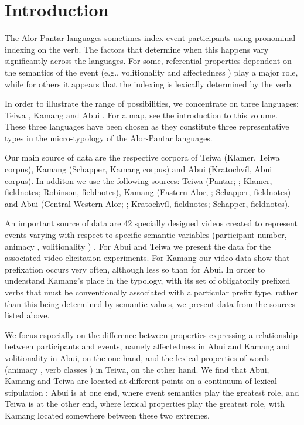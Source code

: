 
  
\section{Introduction}
\label{sec:10:1}
\hypertarget{Toc385255248}{}The Alor-Pantar languages sometimes index event participants using pronominal indexing  on the verb. The factors that determine when this happens vary significantly across the languages. For some, referential properties  dependent on the semantics of the event (e.g., volitionality  and affectedness ) play a major role, while for others it appears that the indexing is lexically determined by the verb.

In order to illustrate the range of possibilities, we concentrate on three languages: Teiwa , Kamang  and Abui . For a map, see the introduction to this volume. These three languages have been chosen as they constitute three representative types in the micro-typology of the Alor-Pantar languages. 

Our main source of data are the respective corpora of Teiwa  (Klamer, Teiwa corpus), Kamang  (Schapper, Kamang corpus) and Abui  (Kratochv\'il, Abui corpus). In additon we use the following sources: Teiwa (Pantar; \citet{Klamer2010grammar}; Klamer, fieldnotes; Robinson, fieldnotes), Kamang (Eastern Alor, \citet{SchapperEtAl2011}; Schapper, fieldnotes) and Abui (Central-Western Alor; \citet{Kratochvil2007,Kratochvil2011transitivity}; Kratochv\'il, fieldnotes; Schapper, fieldnotes).

An important source of data are 42 specially designed videos created to represent events varying with respect to specific semantic variables (participant number, animacy , volitionality ) \citep[see][]{FeddenEtAl2013}. For Abui and Teiwa we present the data for the associated video elicitation experiments. For Kamang  our video data show that prefixation occurs very often, although less so than for Abui. In order to understand Kamang's place in the typology, with its set of obligatorily prefixed verbs that must be conventionally associated with a particular prefix type, rather than this being determined by semantic values, we present data from the sources listed above.

We focus especially on the difference between properties expressing a relationship between participants and events, namely affectedness  in Abui  and Kamang  and volitionality  in Abui, on the one hand, and the lexical properties of words (animacy , verb classes ) in Teiwa, on the other hand. We find that Abui, Kamang and Teiwa are located at different points on a continuum of lexical stipulation : Abui is at one end, where event semantics play the greatest role, and Teiwa is at the other end, where lexical properties play the greatest role, with Kamang located somewhere between these two extremes.

